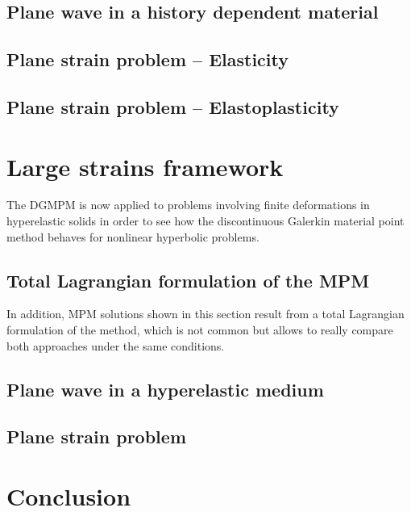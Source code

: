 \subsection{Plane wave in a history dependent material}
\label{sec:hpp_planewave}


\subsection{Plane strain problem -- Elasticity}
\label{sec:el_planestrain}


\subsection{Plane strain problem -- Elastoplasticity}
\label{sec:ep_planestrain}


\section{Large strains framework}
\label{sec:he_simulations}
The DGMPM is now applied to problems involving finite deformations in hyperelastic solids in order to see how the discontinuous Galerkin material point method behaves for nonlinear hyperbolic problems.
\subsection{Total Lagrangian formulation of the MPM}
In addition, MPM solutions shown in this section result from a total Lagrangian formulation of the method, which is not common but allows to really compare both approaches under the same conditions.
\subsection{Plane wave in a hyperelastic medium}
\label{sec:he_planewave}


\subsection{Plane strain problem}
\label{sec:he_plate}




\section{Conclusion}
